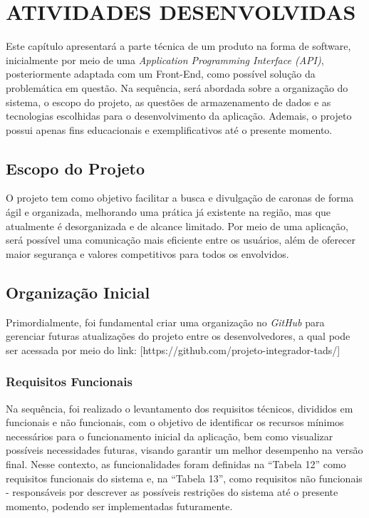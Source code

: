\chapter{ATIVIDADES DESENVOLVIDAS}

Este capítulo apresentará a parte técnica de um produto na forma de software, inicialmente por meio de uma \textit{Application Programming Interface (API)}, posteriormente adaptada com um Front-End, como possível solução da problemática em questão. Na sequência, será abordada sobre a organização do sistema, o escopo do projeto, as questões de armazenamento de dados e as tecnologias escolhidas para o desenvolvimento da aplicação. Ademais, o projeto possui apenas fins educacionais e exemplificativos até o presente momento.

\section{Escopo do Projeto}

O projeto tem como objetivo facilitar a busca e divulgação de caronas de forma ágil e organizada, melhorando uma prática já existente na região, mas que atualmente é desorganizada e de alcance limitado. Por meio de uma aplicação, será possível uma comunicação mais eficiente entre os usuários, além de oferecer maior segurança e valores competitivos para todos os envolvidos.


\section{Organização Inicial}

Primordialmente, foi fundamental criar uma organização no\textit{ GitHub} para gerenciar futuras atualizações do projeto entre os desenvolvedores, a qual pode ser acessada por meio do link: [https://github.com/projeto-integrador-tads/]

\subsection{Requisitos Funcionais}

Na sequência, foi realizado o levantamento dos requisitos técnicos, divididos em funcionais e não funcionais, com o objetivo de identificar os recursos mínimos necessários para o funcionamento inicial da aplicação, bem como visualizar possíveis necessidades futuras, visando garantir um melhor desempenho na versão final. Nesse contexto, as funcionalidades foram definidas na ``Tabela 12'' como requisitos funcionais do sistema e, na ``Tabela 13'', como requisitos não funcionais - responsáveis por descrever as possíveis restrições do sistema até o presente momento, podendo ser implementadas futuramente.

